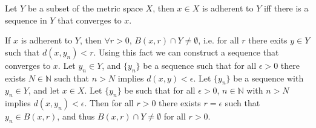 \documentclass[nobib,notoc]{tufte-handout}
\begin{document}
\begin{thm}
\label{thm:1:converge}
	Let \(Y\) be a subset of the metric space \(X\), then \(x\in X\) is adherent to \(Y\) iff there is a sequence in \(Y\) that converges to \(x\).
	\begin{IEEEproof}
		If \(x\) is adherent to \(Y\), then \(\forall r>0\), \(B(x,r)\cap Y\neq\emptyset\), i.e. for all \(r\) there exits \(y\in Y\) such that \(d(x,y_n)<r\). Using this fact we can construct a sequence that converges to \(x\). Let \(y_n\in Y\), and \(\{y_n\}\) be a sequence such that for all \(\epsilon>0\) there exists \(N\in\mathbb{N}\) such that \(n>N\) implies \(d(x,y)<\epsilon\).\bigbreak
		Let \(\{y_n\}\) be a sequence with \(y_n\in Y\), and let \(x\in X\). Let \(\{y_n\}\) be such that for all \(\epsilon>0\), \(n\in\mathbb{N}\) with \(n>N\) implies \(d(x,y_n)<\epsilon\). Then for all \(r>0\) there exists \(r=\epsilon\) such that \(y_n\in B(x,r)\), and thus \(B(x,r)\cap Y\neq\emptyset\) for all \(r>0\).
	\end{IEEEproof}
\end{thm}
\end{document}
